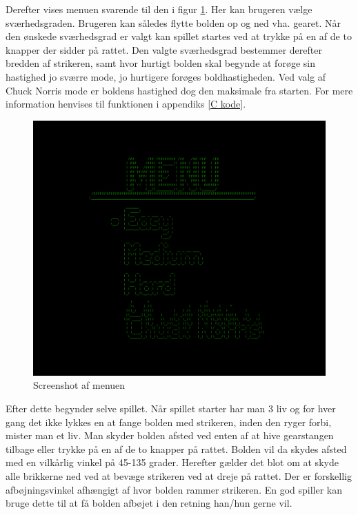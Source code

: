 Derefter vises menuen svarende til den i figur \ref{fig:menu_2}. Her kan brugeren vælge sværhedsgraden. Brugeren kan således flytte bolden op og ned vha. gearet. Når den ønskede sværhedsgrad er valgt kan spillet startes ved at trykke på en af de to knapper der sidder på rattet. Den valgte sværhedsgrad bestemmer derefter bredden af strikeren, samt hvor hurtigt bolden skal begynde at forøge sin hastighed jo sværre mode, jo hurtigere forøges boldhastigheden. Ved valg af Chuck Norris mode er boldens hastighed dog den maksimale fra starten. For mere information henvises til funktionen  i appendiks \ref{C kode}. \\

\begin{figure}[h!]
\centering
\includegraphics[scale=0.25]{figs/screenshots/menu_crop.png}
\caption{Screenshot af menuen}
\label{fig:menu_2}
\end{figure}

Efter dette begynder selve spillet. Når spillet starter har man 3 liv og for hver gang det ikke lykkes en at fange bolden med strikeren, inden den ryger forbi, mister man et liv. Man skyder bolden afsted ved enten af at hive gearstangen tilbage eller trykke på en af de to knapper på rattet. Bolden vil da skydes afsted med en vilkårlig vinkel på 45-135 grader. Herefter gælder det blot om at skyde alle brikkerne ned ved at bevæge strikeren ved at dreje på rattet. Der er forskellig afbøjningsvinkel afhængigt af hvor bolden rammer strikeren. En god spiller kan bruge dette til at få bolden afbøjet i den retning han/hun gerne vil.\\

